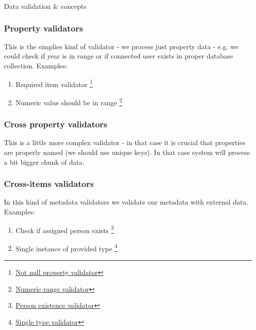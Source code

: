 \documentclass{beamer}
\begin{document}
\begin{section}{Data validation \& concepts}
\begin{frame}
\end{frame}

\begin{frame}
\frametitle{Property validators}
This is the simplies kind of validator - we process just property data - e.g. we could check if year is in range or if connected user exists in proper database collection. \newline Examples:

\begin{enumerate}
	\item Required item validator \footnote[1]{\href{https://github.com/paqaos/DynamicMetadata-SFI2021/blob/main/MovieDatabase/MovieDatabase/Services/Validation/PropertyValidators/General/NotNullValidator.cs}{Not null property validator}}
	\item Numeric value should be in range \footnote[2]{\href{https://github.com/paqaos/DynamicMetadata-SFI2021/blob/main/MovieDatabase/MovieDatabase/Services/Validation/PropertyValidators/Numeric/NumericRangePropertyValidator.cs}{Numeric range validator}}
\end{enumerate}
\end{frame}

\begin{frame}
\frametitle{Cross property validators}
This is a little more complex validator - in that case it is crucial that properties are properly named (we should use unique keys). In that case system will process a bit bigger chunk of data. 
\end{frame}

\begin{frame}
\frametitle{Cross-items validators}
In this kind of metadata validators we validate our metadata with external data. \newline Examples:

\begin{enumerate}
	\item Check if assigned person exists \footnote[1]{\href{https://github.com/paqaos/DynamicMetadata-SFI2021/blob/main/MovieDatabase/MovieDatabase/Services/Validation/PropertyValidators/Person/ExistingPersonValidator.cs}{Person existence validator}}
	\item Single instance of provided type \footnote[2]{\href{https://github.com/paqaos/DynamicMetadata-SFI2021/blob/main/MovieDatabase/MovieDatabase/Services/Validation/PropertyValidators/General/SingleTypeItemValidator.cs}{Single type validator}}
\end{enumerate}


\end{frame}
\end{section}
\end{document}
